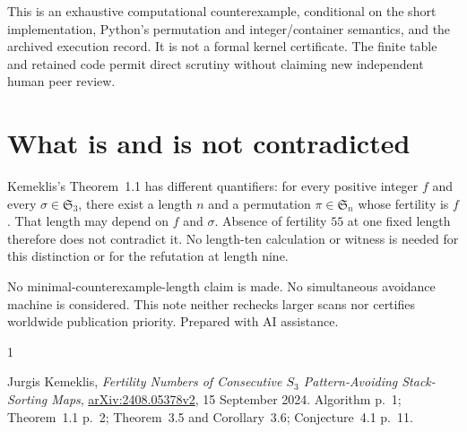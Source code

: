 \documentclass[11pt,a4paper]{article}
\newcommand{\Sn}{\mathfrak S_n}
\begin{document}
This is an exhaustive computational counterexample, conditional on
the short implementation, Python's permutation and integer/container
semantics, and the archived execution record. It is not a formal
kernel certificate. The finite table and retained code permit direct
scrutiny without claiming new independent human peer review.

\section{What is and is not contradicted}
Kemeklis's Theorem~1.1 \cite[p.~2]{K} has different quantifiers:
for every positive integer $f$ and every $\sigma\in\mathfrak S_3$,
there exist a length $n$ and a permutation $\pi\in\Sn$ whose
fertility is $f$. That length may depend on $f$ and $\sigma$.
Absence of fertility $55$ at one fixed length therefore does not
contradict it. No length-ten calculation or witness is needed for
this distinction or for the refutation at length nine.

No minimal-counterexample-length claim is made. No simultaneous
avoidance machine is considered. This note neither rechecks larger
scans nor certifies worldwide publication priority.
Prepared with AI assistance.

\begin{thebibliography}{1}
\raggedright
{}
Jurgis Kemeklis, \emph{Fertility Numbers of Consecutive $S_3$
Pattern-Avoiding Stack-Sorting Maps},
\href{https://arxiv.org/pdf/2408.05378v2}{arXiv:2408.05378v2},
15 September 2024. Algorithm p.~1; Theorem~1.1 p.~2;
Theorem~3.5 and Corollary~3.6; Conjecture~4.1 p.~11.
\end{thebibliography}
\end{document}
